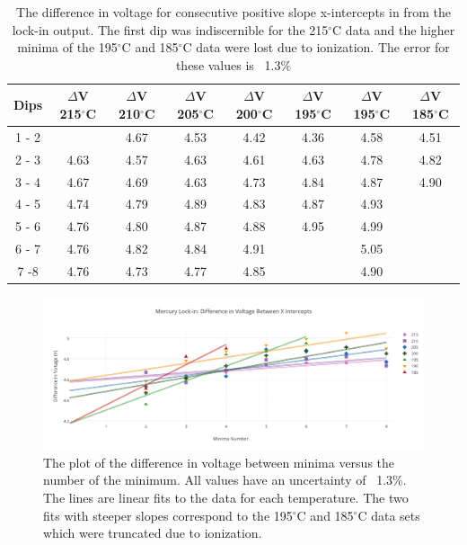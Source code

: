 \documentclass[prb,preprint]{revtex4-1}
\begin{document}
\begin{table}[h!]
\centering

\caption{The difference in voltage for consecutive positive slope x-intercepts in from the lock-in output. The first dip was indiscernible for the 215$^{\circ}$C data and the higher minima of the 195$^{\circ}$C and 185$^{\circ}$C data were lost due to ionization. The error for these values is ~1.3$\%$}

\begin{ruledtabular}
\begin{tabular}{c c c c c c c c}
Dips & $\Delta$V 215$^{\circ}$C & $\Delta$V 210$^{\circ}$C  & $\Delta$V 205$^{\circ}$C &$\Delta$V 200$^{\circ}$C  & $\Delta$V 195$^{\circ}$C  & $\Delta$V 195$^{\circ}$C &$\Delta$V 185$^{\circ}$C  \\
\hline	%
1 - 2 &         & 4.67 & 4.53 & 4.42 & 4.36 & 4.58 & 4.51 \\
2 - 3 & 4.63 & 4.57 & 4.63 & 4.61 & 4.63 & 4.78 & 4.82 \\
3 - 4 & 4.67 & 4.69 & 4.63 & 4.73 & 4.84 & 4.87 & 4.90 \\
4 - 5 & 4.74 & 4.79 & 4.89 & 4.83 & 4.87 & 4.93 &         \\
5 - 6 & 4.76 & 4.80 & 4.87 & 4.88 & 4.95 & 4.99 &         \\
6 - 7 & 4.76 & 4.82 & 4.84 & 4.91 &         & 5.05 &         \\
7 -8  & 4.76 & 4.73 & 4.77 & 4.85 &         & 4.90 &         \\

\end{tabular}
\end{ruledtabular}
\label{hg_lockin_table}
\end{table}


\begin{figure}[h!]
\centering

\includegraphics[width=6in]{lockin_intercepts.pdf}
\caption{The plot of the difference in voltage between minima versus the number of the minimum. All values have an uncertainty of ~1.3$\%$. The lines are linear fits to the data for each temperature. The two fits with steeper slopes correspond to the 195$^{\circ}$C and 185$^{\circ}$C data sets which were truncated due to ionization.}

\label{lockin_intercepts}
\end{figure}
\end{document}
